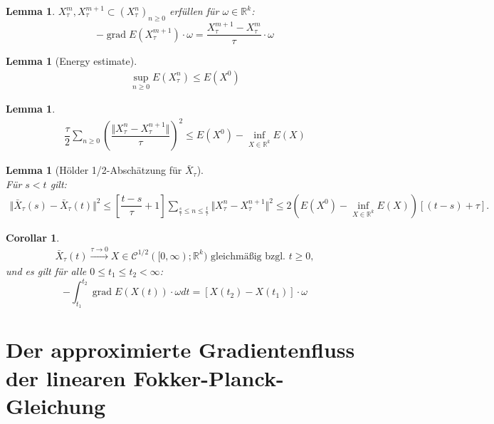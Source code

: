 \documentclass[11pt,a4paper,notitlepage]{scrreprt}
\newcommand{\RR}{\mathbb{R}}
\newcommand{\grad}{\operatorname{grad}}
\newtheorem{cor}[defi]{Corollar}
\newtheorem{lem}[defi]{Lemma}
\begin{document}
\begin{lem}
$X_\tau^m,X_\tau^{m+1}\subset(X_\tau^n)_{n\geq 0}$ erfüllen für $\omega\in\RR^k$: \\
\begin{equation}
-\grad E(X_\tau^{m+1})\cdot\omega= \dfrac{ X_\tau^{m+1}-X_\tau^m}{\tau}\cdot\omega
\end{equation}
\end{lem}

 

\begin{lem}[Energy estimate]
\begin{eqnarray*}
\sup_{n\geq 0}E(X_\tau^n)\leq E(X^0) \label{enest}
\end{eqnarray*}
\end{lem}


\begin{lem}
\begin{eqnarray*}
\dfrac{\tau}{2}\sum_{n\geq 0} \left(\dfrac{\Vert X_\tau^n-X_\tau^{n+1}\Vert}{\tau}\right)^2\leq E(X^0)-\inf_{X\in\RR^k} E(X)\label{totalsquare}
\end{eqnarray*}
\end{lem}


\begin{lem}[Hölder 1/2-Abschätzung für $\bar{X}_\tau$]  $~~$ \\
Für $s<t$ gilt:
\begin{eqnarray*}
\Vert \bar{X}_\tau(s)-\bar{X}_\tau(t)\Vert^2 \leq \left[\dfrac{t-s}{\tau}+1\right] \sum_{\frac{s}{\tau}\leq n \leq \frac{t}{\tau}} \Vert X^n_\tau- X_\tau^{n+1}\Vert^2 \leq 2(E(X^0)-\inf_{X\in\RR^k} E(X))[(t-s)+\tau]. \label{Hölder}
\end{eqnarray*}
\end{lem}

\begin{cor}
\begin{eqnarray*}
\bar{X}_\tau(t) \overset{\tau\to0}{\longrightarrow} X \in \mathcal{C}^{1/2}([0,\infty);\RR^k) \text{ gleichmäßig bzgl. }t\geq 0,
\end{eqnarray*}
und es gilt für alle $0\leq t_1\leq t_2<\infty$:
\begin{equation}
-\int_{t_1}^{t_2}\grad E(X(t))\cdot \omega dt = [X(t_2)-X(t_1)]\cdot\omega
\end{equation}
\end{cor}

\newpage
\section{Der approximierte Gradientenfluss der linearen Fokker-Planck-Gleichung}
\end{document}
